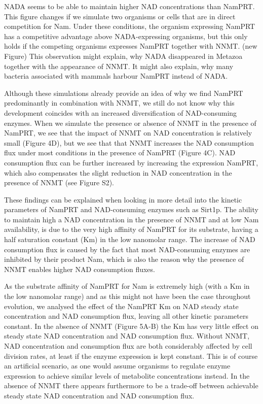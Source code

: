 \documentclass[paper=a4, 12pt]{scrartcl}
\begin{document}
NADA seems to be able to maintain higher NAD concentrations than NamPRT. This figure changes if we simulate two organisms or cells that are in direct competition for Nam. Under these conditions, the organism expressing NamPRT has a competitive advantage above NADA-expressing organisms, but this only holds if the competing organisms expresses NamPRT together with NNMT. (new Figure) This observation might explain, why NADA disappeared in Metazoa together with the appearance of NNMT. It might also explain, why many bacteria associated with mammals harbour NamPRT instead of NADA.

Although these simulations already provide an idea of why we find NamPRT predominantly in combination with NNMT, we still do not know why this development coincides with an increased diversification of NAD-consuming enzymes. When we simulate the presence or absence of NNMT in the presence of NamPRT, we see that the impact of NNMT on NAD concentration is relatively small (Figure 4D), but we see that that NNMT increases the NAD consumption flux under most conditions in the presence of NamPRT (Figure 4C). NAD consumption flux can be further increased by increasing the expression NamPRT, which also compensates the slight reduction in NAD concentration in the presence of NNMT (see Figure S2).

These findings can be explained when looking in more detail into the kinetic parameters of NamPRT and NAD-consuming enzymes such as Sirt1p. The ability to maintain high a NAD concentration in the presence of NNMT and at low Nam availability, is due to the very high affinity of NamPRT for its substrate, having a half saturation constant (Km) in the low nanomolar range. The increase of NAD consumption flux is caused by the fact that most NAD-consuming enzymes are inhibited by their product Nam, which is also the reason why the presence of NNMT enables higher NAD consumption fluxes.

As the substrate affinity of NamPRT for Nam is extremely high (with a Km in the low nanomolar range) and as this might not have been the case throughout evolution, we analysed the effect of the NamPRT Km on NAD steady state concentration and NAD consumption flux, leaving all other kinetic parameters constant. In the absence of NNMT (Figure 5A-B) the Km has very little effect on steady state NAD concentration and NAD consumption flux. Without NNMT, NAD concentration and consumption flux are both considerably affected by cell division rates, at least if the enzyme expression is kept constant. This is of course an artificial scenario, as one would assume organisms to regulate enzyme expression to achieve similar levels of metabolite concentrations instead. In the absence of NNMT there appears furthermore to be a trade-off between achievable steady state NAD concentration and NAD consumption flux.
\end{document}
